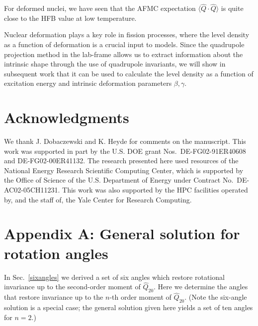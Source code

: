 \documentclass[prc,twocolumn,aps,showpacs,floatfix,nofootinbib,letterpaper,preprintnumbers]{revtex4-1}
\begin{document}
For deformed nuclei, we have seen that the AFMC expectation $\langle \hat Q \cdot \hat Q \rangle$ is quite close to the HFB value at low temperature.

Nuclear deformation plays a key role in fission processes, where the level density as a function of deformation is a crucial input to models. Since the quadrupole projection method in the lab-frame allows us to extract information about the intrinsic shape through the use of quadrupole invariants, we will show in subsequent work that it can be used to calculate the level density as a function of excitation energy and intrinsic deformation parameters $\beta, \gamma$.

\section*{Acknowledgments} 

We thank J. Dobaczewski and K. Heyde for comments on the manuscript. This work was supported in part by the U.S. DOE grant Nos.~DE-FG02-91ER40608 and DE-FG02-00ER41132.
The research presented here used resources of the National Energy Research Scientific Computing Center, which is supported by the Office of Science of the U.S. Department of Energy under Contract No.~DE-AC02-05CH11231.  This work was also supported by the HPC facilities operated by, and the staff of, the Yale Center for Research Computing.

\section*{Appendix A: General solution for rotation angles} \label{appdx_angles}

In Sec.~\ref{sixangles} we derived a set of six angles which restore rotational invariance up to the second-order moment of $\hat Q_{20}$. Here we determine the angles that restore invariance up to the $n$-th order moment of $\hat{Q}_{2 0}$. (Note the six-angle solution is a special case; the general solution given here yields a set of ten angles for $n=2$.)
\end{document}
